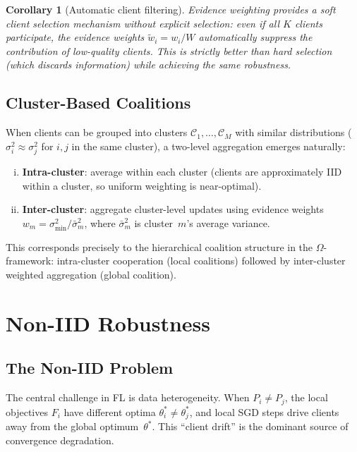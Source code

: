 \documentclass[11pt,a4paper]{article}
\newtheorem{corollary}[theorem]{Corollary}
\newcommand{\cC}{\mathcal{C}}
\begin{document}
\begin{corollary}[Automatic client filtering]\label{cor:auto-filter}
Evidence weighting provides a soft client selection mechanism without
explicit selection: even if all $K$ clients participate, the evidence
weights $\tilde{w}_i = w_i / W$ automatically suppress the contribution
of low-quality clients. This is strictly better than hard selection
(which discards information) while achieving the same robustness.
\end{corollary}

\subsection{Cluster-Based Coalitions}

When clients can be grouped into clusters $\cC_1, \ldots, \cC_M$ with
similar distributions ($\sigma_i^2 \approx \sigma_j^2$ for $i, j$ in the
same cluster), a two-level aggregation emerges naturally:

\begin{enumerate}[(i)]
  \item \textbf{Intra-cluster}: average within each cluster (clients are
    approximately IID within a cluster, so uniform weighting is near-optimal).
  \item \textbf{Inter-cluster}: aggregate cluster-level updates using
    evidence weights $w_m = \sigma_{\min}^2 / \bar{\sigma}_m^2$, where
    $\bar{\sigma}_m^2$ is cluster~$m$'s average variance.
\end{enumerate}

This corresponds precisely to the hierarchical coalition structure in
the $\Omega$-framework: intra-cluster cooperation (local coalitions)
followed by inter-cluster weighted aggregation (global coalition).


\section{Non-IID Robustness}
\label{sec:noniid}

\subsection{The Non-IID Problem}

The central challenge in FL is data heterogeneity. When $P_i \neq P_j$,
the local objectives $F_i$ have different optima $\theta_i^* \neq \theta_j^*$,
and local SGD steps drive clients away from the global optimum~$\theta^*$.
This ``client drift'' is the dominant source of convergence degradation.
\end{document}
